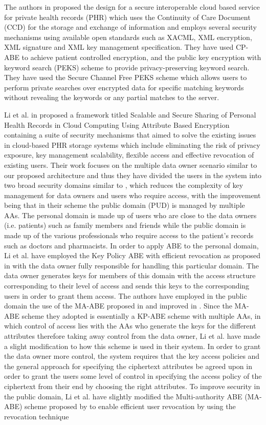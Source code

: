 The authors in \cite{Hsieh2012} proposed the design for a secure interoperable cloud based service for private health records (PHR) which uses the Continuity of Care Document (CCD) for the storage and exchange of information and employs several security mechanisms using available open standards such as XACML, XML encryption, XML signature and XML key management specification. They have used CP-ABE to achieve patient controlled encryption, and the public key encryption with keyword search (PEKS) scheme to provide privacy-preserving keyword search. They have used the Secure Channel Free PEKS scheme which allows users to perform private searches over encrypted data for specific matching keywords without revealing the keywords or any partial matches to the server.

Li et al. in \cite{Li2013} proposed a framework titled Scalable and Secure Sharing of Personal Health Records in Cloud Computing Using Attribute Based Encryption containing a suite of security mechanisms that aimed to solve the existing issues in cloud-based PHR storage systems which include eliminating the risk of privacy exposure, key management scalability, flexible access and effective revocation of existing users. Their work focuses on the multiple data owner scenario similar to our proposed architecture and thus they have divided the users in the system into two broad security domains similar to \cite{Ibraimi2010}, which reduces the complexity of key management for data owners and users who require access, with the improvement being that in their scheme the public domain (PUD) is managed by multiple AAs. The personal domain is made up of users who are close to the data owners (i.e. patients) such as family members and friends while the public domain is made up of the various professionals who require access to the patient’s records such as doctors and pharmacists. In order to apply ABE to the personal domain, Li et al. have employed the Key Policy ABE with efficient revocation as proposed in \cite{Yu2010a} with the data owner fully responsible for handling this particular domain. The data owner generates keys for members of this domain with the access structure corresponding to their level of access and sends this keys to the corresponding users in order to grant them access. The authors have employed in the public domain the use of the MA-ABE proposed in \cite{Chase2007} and improved in \cite{Chase2009}. Since the MA-ABE scheme they adopted is essentially a KP-ABE scheme with multiple AAs, in which control of access lies with the AAs who generate the keys for the different attributes therefore taking away control from the data owner, Li et al. have made a slight modification to how this scheme is used in their system. In order to grant the data owner more control, the system requires that the key access policies and the general approach for specifying the ciphertext attributes be agreed upon in order to grant the users some level of control in specifying the access policy of the ciphertext from their end by choosing the right attributes. To improve security in the public domain, Li et al. have slightly modified the Multi-authority ABE (MA-ABE) scheme proposed by \cite{Chase2009} to enable efficient user revocation by using the revocation technique 